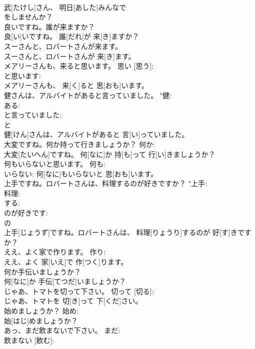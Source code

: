 \documentclass[8pt]{extreport}
\begin{document}
\begin{CJK}{UTF8}{min}
\\	武[たけし]さん、 明日[あした]みんなで 
\\	をしませんか？		
\\	良いですね。誰が来ますか？	
\\	良[い]いですね。 誰[だれ]が 来[き]ますか？	
\\	スーさんと、ロバートさんが来ます。	
\\	スーさんと、ロバートさんが 来[き]ます。	
\\	メアリーさんも、来ると思います。	思い [思う]: 
\\	と思います: 
\\	メアリーさんも、 来[く]ると 思[おも]います。		
\\	健さんは、アルバイトがあると言っていました。	"健: 
\\	ある: 
\\	と言っていました: 
\\	と 
\\	健[けん]さんは、アルバイトがあると 言[い]っていました。		
\\	大変ですね。何か持って行きましょうか？	何か: 
\\	大変[たいへん]ですね。 何[なに]か 持[も]って 行[い]きましょうか？		
\\	何もいらないと思います。	何も: 
\\	いらない:	何[なに]もいらないと 思[おも]います。		
\\	上手ですね。ロバートさんは、料理するのが好きですか？	"上手: 
\\	料理: 
\\	する: 
\\	のが好きです: 
\\	の 
\\	上手[じょうず]ですね。ロバートさんは、 料理[りょうり]するのが 好[す]きですか？		
\\	ええ、よく家で作ります。	作り: 
\\	ええ、よく 家[いえ]で 作[つく]ります。		
\\	何か手伝いましょうか？	
\\	何[なに]か 手伝[てつだ]いましょうか？	
\\	じゃあ、トマトを切って下さい。	切って [切る]: 
\\	じゃあ、トマトを 切[き]って 下[くだ]さい。		
\\	始めましょうか？	始め: 
\\	始[はじ]めましょうか？		
\\	あっ、まだ飲まないで下さい。	まだ: 
\\	飲まない [飲む]: 

\end{CJK}
\end{document}
